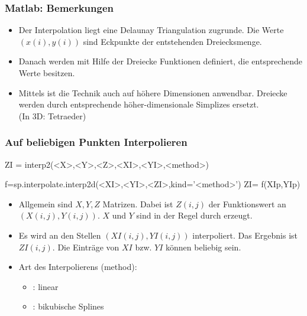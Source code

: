 \documentclass[hyperref={xetex}]{beamer}
\begin{document}
%
% 
\begin{frame}[fragile]\frametitle{Matlab: Bemerkungen}
\begin{itemize}
\item Der Interpolation liegt eine \alert{Delaunay} Triangulation zugrunde. Die Werte
  $(x(i),y(i))$ sind Eckpunkte der entstehenden Dreiecksmenge.
\item Danach werden mit Hilfe der Dreiecke Funktionen  definiert, die
  entsprechende Werte besitzen. 
\item Mittels  ist die Technik auch auf h\"ohere Dimensionen
  anwendbar. Dreiecke werden durch entsprechende höher-dimensionale
  Simplizes ersetzt. \\
(In 3D: Tetraeder)
\end{itemize}
\end{frame}
%
% 
\begin{frame}[fragile]\frametitle{Auf beliebigen Punkten Interpolieren}
\begin{matlabin}
ZI = interp2(<X>,<Y>,<Z>,<XI>,<YI>,<method>)
\end{matlabin}
\begin{pyin}
f=sp.interpolate.interp2d(<XI>,<YI>,<ZI>,kind='<method>')
ZI= f(XIp,YIp)
\end{pyin}
\begin{itemize}
\item Allgemein sind $X,Y,Z$ Matrizen. Dabei ist $Z(i,j)$ der Funktionswert an
  $(X(i,j),Y(i,j))$. $X$ und $Y$ sind in der Regel durch  erzeugt. 
\item Es wird an den Stellen $(XI(i,j),YI(i,j))$ interpoliert. Das Ergebnis
  ist $ZI(i,j)$. Die Einträge von $XI$ bzw. $YI$ k\"onnen beliebig sein. 
\item Art des Interpolierens (method):
\begin{itemize}
 \item {}: linear
 \item {}: bikubische Splines
\end{itemize}
\end{itemize}
\end{frame}
\end{document}

